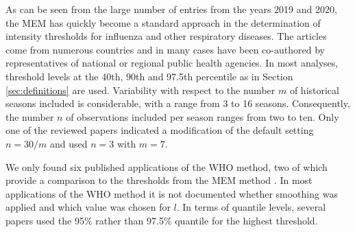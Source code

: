 \documentclass[12pt]{article}
\begin{document}
As can be seen from the large number of entries from the years 2019 and 2020, the MEM has quickly become a standard approach in the determination of intensity thresholds for influenza and other respiratory diseases. The articles come from numerous countries and in many cases have been co-authored by representatives of national or regional public health agencies. In most analyses, threshold levels at the 40th, 90th and 97.5th percentile as in Section \ref{sec:definitions} are used. %
 Variability with respect to the number $m$ of historical seasons included is considerable, with a range from 3 to 16 seasons. Consequently, the number $n$ of observations included per season ranges from two to ten. Only one of the reviewed papers \citep{Dahlgren2022} indicated a modification of the default setting $n = 30/m$  and used $n = 3$ with $m = 7$.

We only found six published applications of the WHO method, two of which provide a comparison to the thresholds from the MEM method \citep{Rguig2020, Teeluck2021}. In most applications of the WHO method it is not documented whether smoothing was applied and which value was chosen for $l$. In terms of quantile levels, several papers used the 95\% rather than 97.5\% quantile for the highest threshold.
\end{document}
